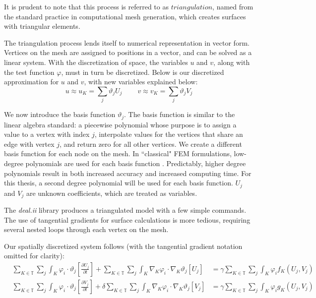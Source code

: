 \documentclass[12pt]{article}
\begin{document}

It is prudent to note that this process is referred to as $triangulation$, named from the standard practice in computational mesh generation, which creates surfaces with triangular elements. 




The triangulation process lends itself to numerical representation in vector form. Vertices on the mesh are assigned to positions in a vector, and can be solved as a linear system. With the discretization of space, the variables $u$ and $v$, along with the test function $\varphi$, must in turn be discretized. Below is our discretized approximation for $u$ and $v$, with new variables explained below:
\begin{equation}
u \approx u_K = \sum_j\vartheta_j U_j ~~~~~~~~~~ v \approx v_K = \sum_j\vartheta_j V_j
\end{equation}

We now introduce the basis function $\vartheta_j$. The basis function is similar to the linear algebra standard: a piecewise polynomial whose purpose is to assign a value to a vertex with index $j$, interpolate values for the vertices that share an edge with vertex $j$, and return zero for all other vertices. We create a different basis function for each node on the mesh. In ``classical" FEM formulations, low-degree polynomials are used for each basis function \cite{Flaherty2005}. Predictably, higher degree polynomials result in both increased accuracy and increased computing time. For this thesis, a second degree polynomial will be used for each basis function. $U_j$ and $V_j$ are unknown coefficients, which are treated as variables.

The \textit{deal.ii} library produces a triangulated model with a few simple commands. The use of tangential gradients for surface calculations is more tedious, requiring several nested loops through each vertex on the mesh. 

Our spatially discretized system follows (with the tangential gradient notation omitted for clarity):
\begin{equation}
\begin{aligned}
&\sum_{K\in\mathbb{T}}\sum_j 
\int_K \varphi_i\cdot\vartheta_j\left[\frac{\partial U_j}{\partial t}\right] + 
\sum_{K\in\mathbb{T}}\sum_j
\int_K \nabla_K\varphi_i\cdot\nabla_K \vartheta_j \left[U_j\right] &= 
\gamma\sum_{K\in\mathbb{T}}\sum_j
\int_K \varphi_i f_K(U_j,V_j) \\
&\sum_{K\in\mathbb{T}}\sum_j
\int_K \varphi_i\cdot\vartheta_j\left[\frac{\partial V_j}{\partial t}\right] + 
\delta\sum_{K\in\mathbb{T}}\sum_j
\int_K \nabla_K\varphi_i\cdot\nabla_K \vartheta_j \left[V_j\right] &=
\gamma\sum_{K\in\mathbb{T}}\sum_j
\int_K \varphi_i g_K(U_j,V_j)
\end{aligned}
\end{equation}
\end{document}
